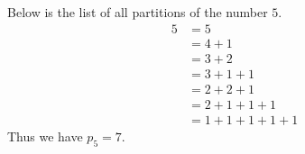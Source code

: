 

\setcounter{section}{3}
\setcounter{subsection}{4}
\setcounter{dfn}{4}

\begin{exl}
Below is the list of all partitions of the number $5$.
\begin{align*}
5 &= 5\\
&= 4+1\\
&= 3+2\\
&= 3+1+1\\
&= 2+2+1\\
&= 2+1+1+1\\
&= 1+1+1+1+1
\end{align*}
Thus we have $p_5=7$.
\end{exl}

